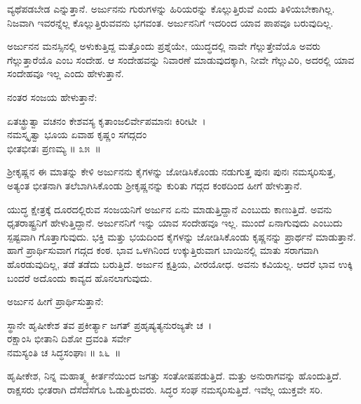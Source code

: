 ವ್ಯಥೆಪಡಬೇಡ ಎನ್ನುತ್ತಾನೆ. ಅರ್ಜುನನು ಗುರುಗಳನ್ನು ಹಿರಿಯರನ್ನು ಕೊಲ್ಲುತ್ತಿರುವೆ ಎಂದು ತಿಳಿಯಬೇಕಾಗಿಲ್ಲ. ನಿಜವಾಗಿ ಇವರನ್ನೆಲ್ಲ ಕೊಲ್ಲುತ್ತಿರುವವನು ಭಗವಂತ. ಅರ್ಜುನನಿಗೆ ಇದರಿಂದ ಯಾವ ಪಾಪವೂ ಬರುವುದಿಲ್ಲ.

ಅರ್ಜುನನ ಮನಸ್ಸಿನಲ್ಲಿ ಅಳುಕುತ್ತಿದ್ದ ಮತ್ತೊಂದು ಪ್ರಶ್ನೆಯೇ, ಯುದ್ಧದಲ್ಲಿ ನಾವೇ ಗೆಲ್ಲುತ್ತೇ\-ವೆಯೊ ಅವರು ಗೆಲ್ಲುತ್ತಾರೆಯೊ ಎಂಬ ಸಂದೇಹ. ಆ ಸಂದೇಹವನ್ನು ನಿವಾರಣೆ ಮಾಡುವುದಕ್ಕಾಗಿ, ನೀವೇ ಗೆಲ್ಲುವಿರಿ, ಅದರಲ್ಲಿ ಯಾವ ಸಂದೇಹವೂ ಇಲ್ಲ ಎಂದು ಹೇಳುತ್ತಾನೆ.

ನಂತರ ಸಂಜಯ ಹೇಳುತ್ತಾನೆ:

\begin{shloka}
ಏತಚ್ಛ್ರುತ್ವಾ ವಚನಂ ಕೇಶವಸ್ಯ ಕೃತಾಂಜಲಿರ್ವೇಪಮಾನಃ ಕಿರೀಟೀ~।\\ನಮಸ್ಕೃತ್ವಾ ಭೂಯ ಏವಾಹ ಕೃಷ್ಣಂ ಸಗದ್ಗದಂ\\ ಭೀತಭೀತಃ ಪ್ರಣಮ್ಯ \hfill॥ ೩೫~॥
\end{shloka}

\begin{artha}
ಶ‍್ರೀಕೃಷ್ಣನ ಈ ಮಾತನ್ನು ಕೇಳಿ ಅರ್ಜುನನು ಕೈಗಳನ್ನು ಜೋಡಿಸಿಕೊಂಡು ನಡುಗುತ್ತ ಪುನಃ ಪುನಃ ನಮಸ್ಕರಿಸುತ್ತ, ಅತ್ಯಂತ ಭೀತನಾಗಿ ತಲೆಬಾಗಿಸಿಕೊಂಡು ಶ‍್ರೀಕೃಷ್ಣನನ್ನು ಕುರಿತು ಗದ್ಗದ ಕಂಠದಿಂದ ಹೀಗೆ ಹೇಳುತ್ತಾನೆ.
\end{artha}

ಯುದ್ಧ ಕ್ಷೇತ್ರಕ್ಕೆ ದೂರದಲ್ಲಿರುವ ಸಂಜಯನಿಗೆ ಅರ್ಜುನ ಏನು ಮಾಡುತ್ತಿದ್ದಾನೆ ಎಂಬುದು ಕಾಣುತ್ತಿದೆ. ಅವನು ಧೃತರಾಷ್ಟ್ರನಿಗೆ ಹೇಳುತ್ತಿದ್ದಾನೆ. ಅರ್ಜುನನಿಗೆ ಇನ್ನು ಯಾವ ಸಂದೇಹವೂ ಇಲ್ಲ. ಮುಂದೆ ಏನಾಗುವುದು ಎಂಬುದು ಸ್ಪಷ್ಟವಾಗಿ ಗೊತ್ತಾಗುವುದು. ಭಕ್ತಿ ಮತ್ತು ಭಯದಿಂದ ಕೈಗಳನ್ನು ಜೋಡಿಸಿಕೊಂಡು ಕೃಷ್ಣನನ್ನು ಪ್ರಾರ್ಥನೆ ಮಾಡುತ್ತಾನೆ. ಹಾಗೆ ಪ್ರಾರ್ಥಿಸುವಾಗ ಗದ್ಗದ ಕಂಠ. ಭಾವ ಒಳಗಿನಿಂದ ಉಕ್ಕುತ್ತಿರುವಾಗ ಬಾಯಿನಲ್ಲಿ ಮಾತು ಸರಾಗವಾಗಿ ಹೊರಡುವುದಿಲ್ಲ, ತಡೆ ತಡೆದು ಬರುತ್ತಿದೆ. ಅರ್ಜುನ ಕ್ಷತ್ರಿಯ, ವೀರಯೋಧ. ಅವನು ಕವಿಯಲ್ಲ. ಆದರೆ ಭಾವ ಉಕ್ಕಿ ಬಂದರೆ ಅದೊಂದು ಕಾವ್ಯದ ಹೊನಲಾಗುವುದು.

ಅರ್ಜುನ ಹೀಗೆ ಪ್ರಾರ್ಥಿಸುತ್ತಾನೆ:

\begin{shloka}
ಸ್ಥಾನೇ ಹೃಷೀಕೇಶ ತವ ಪ್ರಕೀರ್ತ್ಯಾ ಜಗತ್ ಪ್ರಹೃಷ್ಯತ್ಯನುರಜ್ಯತೇ ಚ~।\\ರಕ್ಷಾಂಸಿ ಭೀತಾನಿ ದಿಶೋ ದ್ರವಂತಿ ಸರ್ವೇ\\ ನಮಸ್ಯಂತಿ ಚ ಸಿದ್ಧಸಂಘಾಃ \hfill॥ ೩೬~॥
\end{shloka}

\begin{artha}
ಹೃಷೀಕೇಶ, ನಿನ್ನ ಮಹಾತ್ಮ್ಯ ಕೀರ್ತನೆಯಿಂದ ಜಗತ್ತು ಸಂತೋಷಪಡುತ್ತಿದೆ. ಮತ್ತು ಅನುರಾಗವನ್ನು ಹೊಂದುತ್ತಿದೆ. ರಾಕ್ಷಸರು ಭೀತರಾಗಿ ದೆಸೆದೆಸೆಗೂ ಓಡುತ್ತಿರುವರು. ಸಿದ್ಧರ ಸಂಘ ನಮಸ್ಕರಿಸುತ್ತಿದೆ. ಇವೆಲ್ಲ ಯುಕ್ತವೇ ಸರಿ.
\end{artha}

